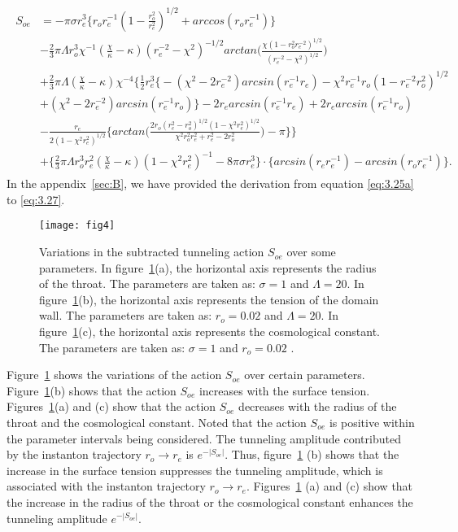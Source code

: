 \documentclass[12pt]{article}
\begin{document}
\begin{eqnarray}\begin{split}
\label{eq:3.27}%
S_{oe}&=-\pi\sigma r_{e}^{3}\big\{r_{o}r_{e}^{-1}(1-\frac{r_{o}^{2}}{r_{e}^{2}})^{1/2}+arccos(r_{o}r_{e}^{-1})\big\}\\& -\frac{2}{3}\pi\Lambda r_{o}^{3}\chi^{-1}(\frac{\chi}{\kappa}-\kappa)(r_{e}^{-2}-\chi^{2})^{-1/2}arctan\big(\frac{\chi(1-r_{o}^{2}r_{e}^{-2})^{1/2}}{(r_{e}^{-2}-\chi^{2})^{1/2}}\big)
\\&+\frac{2}{3}\pi\Lambda(\frac{\chi}{\kappa}-\kappa)\chi^{-4}\Big\{\frac{1}{2}r_{e}^{3}\big\{-(\chi^{2}-2r_{e}^{-2})arcsin(r_{e}^{-1}r_{e})-\chi^{2}r_{e}^{-1}r_{o}(1-r_{e}^{-2}r_{o}^{2})^{1/2}
\\&+(\chi^{2}-2r_{e}^{-2})arcsin(r_{e}^{-1}r_{o})\big\}-2r_{e}arcsin(r_{e}^{-1}r_{e})+2r_{e}arcsin(r_{e}^{-1}r_{o})
\\&-\frac{r_{e}}{2(1-\chi^{2}r_{e}^{2})^{1/2}}\big\{arctan\big(\frac{2r_{o}(r_{e}^{2}-r_{o}^{2})^{1/2}(1-\chi^{2}r_{e}^{2})^{1/2}}{\chi^{2}r_{o}^{2}r_{e}^{2}+r_{e}^{2}-2r_{o}^{2}}\big)-\pi\big\}\Big\}
\\&+\big\{\frac{2}{3}\pi\Lambda r_{o}^{3}r_{e}^{2}(\frac{\chi}{\kappa}-\kappa)(1-\chi^{2}r_{e}^{2})^{-1}-8\pi\sigma r_{e}^{3}\big\}\cdot\big\{arcsin(r_{e}r_{e}^{-1})-arcsin(r_{o}r_{e}^{-1})\big\}.
\end{split}
\end{eqnarray}
In the appendix~\ref{sec:B}, we have provided the derivation from equation \eqref{eq:3.25a} to \eqref{eq:3.27}.


\begin{figure}[tbp]
\centering
\texttt{[image: fig4]}
\caption{\label{fig:8}Variations in the subtracted tunneling action $S_{oe}$ over some parameters. In figure~\ref{fig:8}(a), the horizontal axis represents the radius of the throat. The parameters are taken as: $\sigma=1$ and $\Lambda=20$. In figure~\ref{fig:8}(b), the horizontal axis represents the tension of the domain wall. The parameters are taken as: $r_{o}=0.02$ and $\Lambda=20$. In figure~\ref{fig:8}(c), the horizontal axis represents the cosmological constant. The parameters are taken as: $\sigma=1$ and $r_{o}=0.02$ .}
\end{figure}

Figure~\ref{fig:8} shows the variations of the action $S_{oe}$ over certain parameters. Figure~\ref{fig:8}(b) shows that the action $S_{oe}$ increases with the surface tension. Figures~\ref{fig:8}(a) and (c) show that the action $S_{oe}$ decreases with the radius of the throat and the cosmological constant. Noted that the action $S_{oe}$ is positive within the parameter intervals being considered. The tunneling amplitude contributed by the instanton trajectory $r_{o}\rightarrow r_{e}$ is $e^{-|S_{oe}|}$. Thus, figure~\ref{fig:8} (b) shows that the increase in the surface tension suppresses the tunneling amplitude, which is associated with the instanton trajectory $r_{o}\rightarrow r_{e}$. Figures~\ref{fig:8} (a) and (c) show that the increase in the radius of the throat or the cosmological constant enhances the tunneling amplitude $e^{-|S_{oe}|}$.
\end{document}
